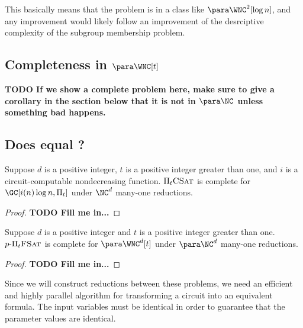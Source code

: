 \documentclass{article}
\newcommand{\todo}[1]{\textbf{TODO #1}}
\newcommand{\dash}{\textnormal{-}}
\newcommand{\pPiFSAT}{p \dash \Pi_t \textsc{FSat}}
\newcommand{\PiCSAT}{\Pi_t \textsc{CSat}}
\begin{document}
This basically means that the problem is in a class like $\para \WNC^2[\log n]$, and any improvement would likely follow an improvement of the desrciptive complexity of the subgroup membership problem.

\subsection{Completeness in \texorpdfstring{$\para \WNC[t]$}{paraWNC[t]}}

\todo{If we show a complete problem here, make sure to give a corollary in the section below that it is not in $\para \NC$ unless something bad happens.}

\subsection{Does \texorpdfstring{\para \NC}{paraNC} equal \texorpdfstring{\para \WNC[t]}{paraWNC[t]}?}

\begin{theorem}\label{thm:picsatgc}
  Suppose $d$ is a positive integer, $t$ is a positive integer greater than one, and $i$ is a circuit-computable nondecreasing function.
  $\PiCSAT$ is complete for $\GC[i(n) \log n, \Pi_t]$ under $\NC^d$ many-one reductions.
\end{theorem}
\begin{proof}
  \todo{Fill me in...}
\end{proof}

\begin{theorem}\label{thm:ppifsat}
  Suppose $d$ is a positive integer and $t$ is a positive integer greater than one.
  $\pPiFSAT$ is complete for $\para \WNC^d[t]$ under $\para \NC^d$ many-one reductions.
\end{theorem}
\begin{proof}
  \todo{Fill me in...}
\end{proof}

Since we will construct reductions between these problems, we need an efficient and highly parallel algorithm for transforming a circuit into an equivalent formula.
The input variables must be identical in order to guarantee that the parameter values are identical.
\end{document}
